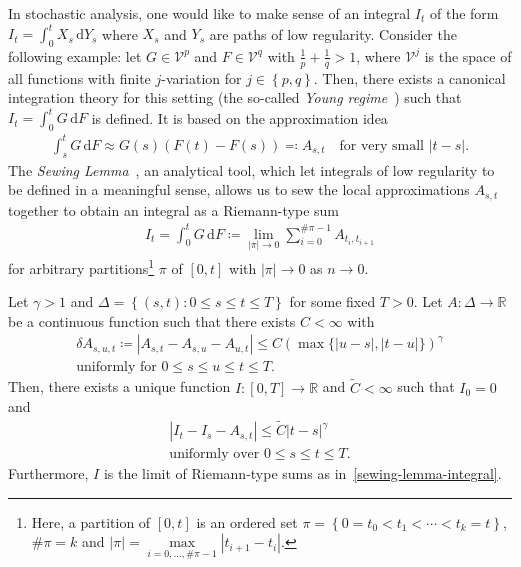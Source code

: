 In stochastic analysis, one would like to make sense of an integral \(I_t\)  of the form \(I_t = \int^t_0 X_s \, \mathrm{d}Y_s\) where \(X_s\) and \(Y_s\) are paths of low regularity. Consider the following example: let \(G \in \mathcal{V}^p\) and \(F \in \mathcal{V}^q\) with \(\frac{1}{p} + \frac{1}{q} > 1\), where \(\mathcal{V}^j\) is the space of all functions with finite \(j\)-variation for \( j \in \left \{ p,q \right \} \). Then, there exists a canonical integration theory for this setting (the so-called \emph{Young regime}~\cite{Young1936AnIO}) such that \(I_t = \int^t_0 G \, \mathrm{d}F\) is defined. It is based on the approximation idea
\begin{align*}
    \int^t_s G \, \mathrm{d}F \approx G(s)(F(t) - F(s)) \eqqcolon A_{s,t} \quad \text{for very small \(|t-s|\)}.
\end{align*}
The \emph{Sewing Lemma}~\cite{GUBINELLI200486}, an analytical tool, which let integrals of low regularity to be defined in a meaningful sense, allows us to sew the local approximations \(A_{s,t}\) together to obtain an integral as a Riemann-type sum
\begin{align}\label{sewing-lemma-integral}
    I_t = \int^t_0 G \, \mathrm{d}F \coloneqq \lim\limits_{|\pi| \to 0} \sum\limits_{i=0}^{\# \pi - 1} A_{t_i,t_{i+1}}
\end{align}
for arbitrary partitions\footnote{Here, a partition of \([0,t]\) is an ordered set \(\pi = \left \{ 0 = t_0 < t_1 < \cdots < t_k = t  \right \} \), \( \# \pi = k \) and \(|\pi| = \max\limits_{i=0, \ldots ,\# \pi - 1} |t_{i+1} - t_{i}|\).} \( \pi \) of \([0,t]\) with \(|\pi| \to 0\) as \(n \to 0\).
\begin{lemma}\label{first-sewing-lemma}
    Let \(\gamma > 1\) and \( \Delta = \left \{ (s,t) :  0 \leq s \leq t \leq T\right \} \) for some fixed \(T > 0\). Let \(A: \Delta \to \mathbb{R}\) be a continuous function such that there exists \( C <\infty \) with
    \begin{gather}
        \delta A_{s,u,t} \coloneqq |A_{s,t} - A_{s,u} - A_{u,t}| \leq C {(\max \{|u-s|,|t-u|\})}^\gamma \label{sewing-lemma-condition}\\
        \text{uniformly for \(0 \leq s \leq u \leq t \leq T\)}. \nonumber
    \end{gather} 
    Then, there exists a unique function \(I: [0,T] \to \mathbb{R}\) and \(\tilde C < {\infty}\)  such that \(I_0 = 0\) and 
    \begin{gather*}
        |I_t - I_s - A_{s,t}| \leq \tilde C|t-s|^\gamma \\
        \text{uniformly over \(0 \leq s \leq t \leq T\).}
    \end{gather*}  
    Furthermore, \(I\) is the limit of Riemann-type sums as in~\eqref{sewing-lemma-integral}.  
\end{lemma}
